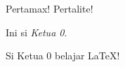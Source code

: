 \documentclass{article}
\begin{document}
Pertamax!  Pertalite!

Ini si \emph{Ketua 0}. 

Si Ketua 0 belajar \LaTeX!
\end{document}
